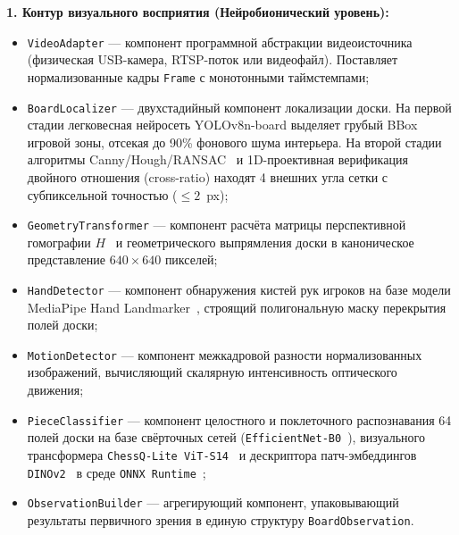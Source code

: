 \textbf{1. Контур визуального восприятия (Нейробионический уровень):}
\begin{itemize}
    \item \texttt{VideoAdapter} --- компонент программной абстракции видеоисточника (физическая USB-камера, RTSP-поток или видеофайл). Поставляет нормализованные кадры \texttt{Frame} с монотонными таймстемпами;
    \item \texttt{BoardLocalizer} --- двухстадийный компонент локализации доски. На первой стадии легковесная нейросеть YOLOv8n-board выделяет грубый BBox игровой зоны, отсекая до 90\% фонового шума интерьера. На второй стадии алгоритмы Canny/Hough/RANSAC~\cite{Bradski2000,Fischler1981} и 1D-проективная верификация двойного отношения (cross-ratio) находят 4 внешних угла сетки с субпиксельной точностью ($\le 2$~px);
    \item \texttt{GeometryTransformer} --- компонент расчёта матрицы перспективной гомографии $H$~\cite{Szeliski2022} и геометрического выпрямления доски в каноническое представление $640 \times 640$ пикселей;
    \item \texttt{HandDetector} --- компонент обнаружения кистей рук игроков на базе модели MediaPipe Hand Landmarker~\cite{Lugaresi2019}, строящий полигональную маску перекрытия полей доски;
    \item \texttt{MotionDetector} --- компонент межкадровой разности нормализованных изображений, вычисляющий скалярную интенсивность оптического движения;
    \item \texttt{PieceClassifier} --- компонент целостного и поклеточного распознавания 64 полей доски на базе свёрточных сетей (\texttt{EfficientNet-B0}~\cite{Wolflein2021}), визуального трансформера \texttt{ChessQ-Lite ViT-S14}~\cite{Dosovitskiy2021} и дескриптора патч-эмбеддингов \texttt{DINOv2}~\cite{Oquab2024} в среде \texttt{ONNX Runtime}~\cite{ONNXRuntime2021};
    \item \texttt{ObservationBuilder} --- агрегирующий компонент, упаковывающий результаты первичного зрения в единую структуру \texttt{BoardObservation}.
\end{itemize}

